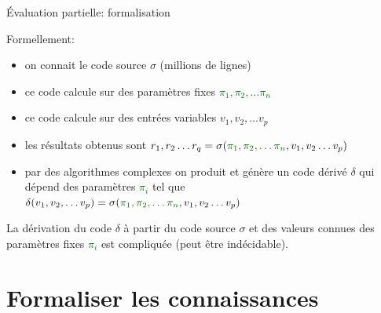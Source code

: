 \documentclass[final,a4,xcolor={svgnames,dvipsnames}]{beamer}
\begin{document}
 \begin{frame}{Évaluation partielle: formalisation}
   
Formellement:

\begin{itemize}
\item on connait le code source $\sigma$ (millions de lignes)
\item ce code calcule sur des paramètres fixes \textcolor{DarkGreen}{$\pi_1, \pi_2, \ldots \pi_n$}
\item ce code calcule sur des entrées variables $v_1, v_2, \ldots v_p$
  
\item les résultats obtenus sont $r_1, r_2 \ldots r_q = \sigma (\textcolor{DarkGreen}{\pi_1, \pi_2, \ldots \pi_n}, v_1, v_2 \ldots v_p)$
\item par des algorithmes complexes on produit et génère un code
  dérivé $\delta$ qui dépend des paramètres \textcolor{DarkGreen}{$\pi_i$} tel que
  $\delta(v_1, v_2, \ldots v_p) = \sigma(\color{DarkGreen}{\pi_1, \pi_2, \ldots \pi_n}\color{black}{,  v_1, v_2 \ldots v_p)}$
\end{itemize}

La dérivation du code $\delta$ à partir du code source $\sigma$ et des
valeurs connues des paramètres fixes \textcolor{DarkGreen}{$\pi_i$}
est compliquée (peut être indécidable).
 \end{frame}


 \section{Formaliser les connaissances}
 \label{sec:form-conn}
 
\end{document}
